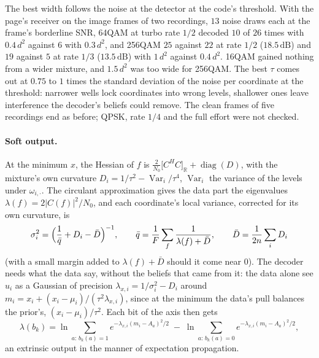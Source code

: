 \documentclass[11pt,a4paper]{article}
\newcommand{\dB}{\,\mathrm{dB}}
\theoremstyle{remark}
\begin{document}
The best width follows the noise at the detector at the code's threshold. With the page's receiver on the image frames of two recordings, $13$ noise draws each at the frame's borderline SNR, 64QAM at turbo rate $1/2$ decoded $10$ of $26$ times with $0.4\,d^2$ against $6$ with $0.3\,d^2$, and 256QAM $25$ against $22$ at rate $1/2$ ($18.5\dB$) and $19$ against $5$ at rate $1/3$ ($13.5\dB$) with $1\,d^2$ against $0.4\,d^2$. 16QAM gained nothing from a wider mixture, and $1.5\,d^2$ was too wide for 256QAM. The best $\tau$ comes out at $0.75$ to $1$ times the standard deviation of the noise per coordinate at the threshold: narrower wells lock coordinates into wrong levels, shallower ones leave interference the decoder's beliefs could remove. The clean frames of five recordings end as before; QPSK, rate $1/4$ and the full effort were not checked.

\paragraph{Soft output.}
At the minimum $x$, the Hessian of $f$ is $\tfrac{2}{N_0}\bigl[C^H C\bigr]_{\mathbb R} + \operatorname{diag}(D)$, with the mixture's own curvature $D_i = 1/\tau^2 - \operatorname{Var}_i/\tau^4$, $\operatorname{Var}_i$ the variance of the levels under $\omega_{i,\cdot}$. The circulant approximation gives the data part the eigenvalues $\lambda(f) = 2|C(f)|^2/N_0$, and each coordinate's local variance, corrected for its own curvature, is
\begin{equation}
\sigma_i^2 = \Bigl(\frac{1}{\bar q} + D_i - \bar D\Bigr)^{-1}, \qquad \bar q = \frac1F \sum_f \frac{1}{\lambda(f) + \bar D}, \qquad \bar D = \frac{1}{2n}\sum_i D_i
\end{equation}
(with a small margin added to $\lambda(f) + \bar D$ should it come near 0). The decoder needs what the data say, without the beliefs that came from it: the data alone see $u_i$ as a Gaussian of precision $\lambda_{x,i} = 1/\sigma_i^2 - D_i$ around $m_i = x_i + (x_i - \mu_i)/(\tau^2 \lambda_{x,i})$, since at the minimum the data's pull balances the prior's, $(x_i - \mu_i)/\tau^2$. Each bit of the axis then gets
\begin{equation}
\lambda(b_k) = \ln \sum_{a:\, b_k(a) = 1} e^{-\lambda_{x,i} (m_i - A_a)^2/2} \;-\; \ln \sum_{a:\, b_k(a) = 0} e^{-\lambda_{x,i} (m_i - A_a)^2/2},
\end{equation}
an extrinsic output in the manner of expectation propagation.
\end{document}
